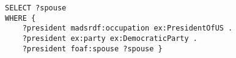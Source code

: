 \begin{lstlisting}[label={lst:sparqlexample},caption={A SPARQL query that returns the spouse of each US president whose party is the democratic.}]
SELECT ?spouse
WHERE { 
	?president madsrdf:occupation ex:PresidentOfUS .
	?president ex:party ex:DemocraticParty .
	?president foaf:spouse ?spouse }
\end{lstlisting}
 
\clearpage